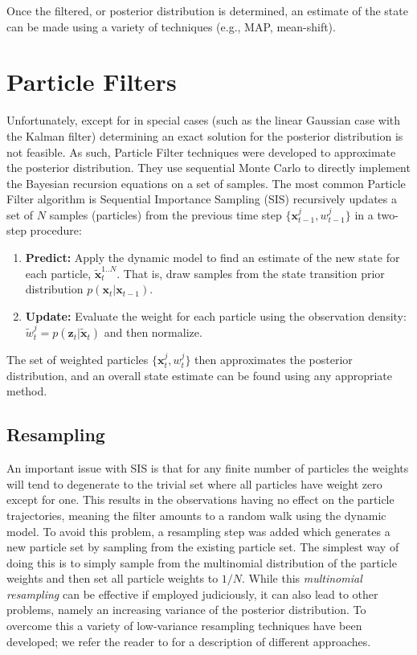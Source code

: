 Once the filtered, or posterior distribution is determined, an estimate of the state can be made using a variety of techniques (e.g., MAP, mean-shift). 

\section{Particle Filters}
Unfortunately, except for in special cases (such as the linear Gaussian case with the Kalman filter) determining an exact solution for the posterior distribution is not feasible. As such, Particle Filter techniques were developed to approximate the posterior distribution. They use sequential Monte Carlo to directly implement the Bayesian recursion equations on a set of samples. The most common Particle Filter algorithm is Sequential Importance Sampling (SIS) recursively updates a set of $N$ samples (particles) from the previous time step $\{ \mathbf{x}^{j}_{t-1}, w^j_{t-1} \}$ in a two-step procedure: 

\begin{enumerate}
 \item \textbf{Predict:} Apply the dynamic model to find an estimate of the new state for each particle, $\tilde{\mathbf{x}}^{1..N}_t$. That is, draw samples from the state transition prior distribution $\mathit{p}(\mathbf{x}_t|\mathbf{x}_{t-1})$.
 \item \textbf{Update:} Evaluate the weight for each particle using the observation density:  $\tilde{w}^j_t = \mathit{p}(\mathbf{z}_t|\tilde{\mathbf{x}}_{t})$ and then normalize.
\end{enumerate}

The set of weighted particles $\{ \mathbf{x}^{j}_{t}, w^j_{t} \}$ then approximates the posterior distribution, and an overall state estimate can be found using any appropriate method.

\subsection{Resampling}
An important issue with SIS is that for any finite number of particles the weights will tend to degenerate to the trivial set where all particles have weight zero except for one. This results in the observations having no effect on the particle trajectories, meaning the filter amounts to a random walk using the dynamic model. To avoid this problem, a resampling step was added \cite{Gordon_1993} which generates a new particle set by sampling from the existing particle set. The simplest way of doing this is to simply sample from the multinomial distribution of the particle weights and then set all particle weights to $1/N$. While this \textit{multinomial resampling} can be effective if employed judiciously, it can also lead to other problems, namely an increasing variance of the posterior distribution. To overcome this a variety of low-variance resampling techniques have been developed; we refer the reader to \cite{Doucet2001} for a description of different approaches.


